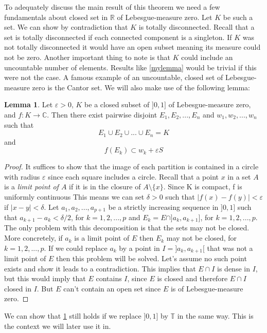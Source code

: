 \documentclass[a4paper,12pt,twoside,BCOR=10mm]{scrbook}
\theoremstyle{definition}
\theoremstyle{definition}
\newtheorem{lemma}[theorem]{Lemma}
\theoremstyle{definition}
\begin{document}
To adequately discuss the main result of this theorem we need a few fundamentals about closed set in $\mathbb{R}$ of Lebesgue-measure zero.
Let $K$ be such a set.
We can show by contradiction that $K$ is totally disconnected.
Recall that a set is totally disconnected if each connected component is a singleton.
If $K$ was not totally disconnected it would have an open subset meaning its measure could not be zero.
Another important thing to note is that $K$ could include an uncountable number of elements.
Results like \ref{mylemma} would be trivial if this were not the case.
A famous example of an uncountable, closed set of Lebesgue-measure zero is the Cantor set.
We will also make use of the following lemma:
\begin{lemma}
\label{somelemma}
Let
	$\varepsilon > 0$,
	$K$ be a closed subset of $]0, 1]$ of Lebesgue-measure zero,
	and $f: K \rightarrow \mathbb{C}$.
Then there exist pairwise disjoint $E_1, E_2, ..., E_n$ and $w_1, w_2, ..., w_n$ such that 
\[
	E_1 \cup E_2 \cup ... \cup E_n = K
\]
and
\[
	f(E_k) \subset w_k + \varepsilon S \tag*{$k = 1, 2, ..., n$.}
\]
\end{lemma}
\begin{proof}
It suffices to show that the image of each partition is contained in a circle with radius $\varepsilon$ since each square includes a circle.
Recall that a point $x$ in a set $A$ is a \emph{limit point of $A$} if it is in the closure of $A \setminus \{x\}$.
Since K is compact, f is uniformly continuous
This means we can set $\delta > 0$ such that $|f(x) - f(y)| < \varepsilon$ if $|x - y| < \delta$.
Let $a_1, a_2, ..., a_{p + 1}$ be a strictly increasing sequence in $]0, 1]$ such that $a_{k + 1} - a_k < \delta/2$, for $k = 1, 2, ..., p$ and $E_k = E \cap ]a_k, a_{k + 1}]$, for $k = 1, 2, ..., p$.
The only problem with this decomposition is that the sets may not be closed.
More concretely, if $a_k$ is a limit point of $E$ then $E_k$ may not be closed, for $k = 1, 2, ..., p$.
If we could replace $a_k$ by a point in $I = ]a_k, a_{k + 1}[$ that was not a limit point of $E$ then this problem will be solved.
Let's assume no such point exists and show it leads to a contradiction.
This implies that $E \cap I$ is dense in $I$, but this would imply that $E$ contains $I$, since $E$ is closed and therefore $E \cap I$ closed in $I$.
But $E$ can't contain an open set since $E$ is of Lebesgue-measure zero.
\end{proof}
We can show that \ref{somelemma} still holds if we replace $]0, 1]$ by $\mathbb{T}$ in the same way.
This is the context we will later use it in.
\end{document}
